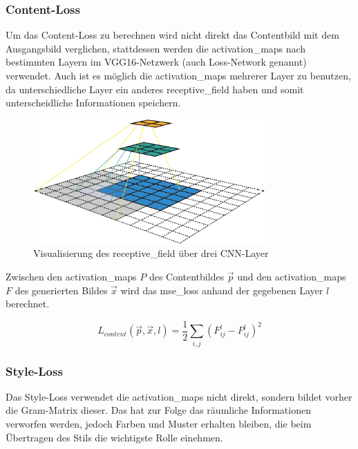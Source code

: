 \subsubsection{Content-Loss}
\label{sec:content_loss}

Um das Content-Loss zu berechnen wird nicht direkt das Contentbild mit dem Ausgangsbild verglichen, stattdessen werden die \gls{activation_map}s nach bestimmten Layern im VGG16-Netzwerk (auch Loss-Network genannt) verwendet. Auch ist es möglich die \gls{activation_map}s mehrerer Layer zu benutzen, da unterschiedliche Layer ein anderes \gls{receptive_field} haben und somit unterscheidliche Informationen speichern.

\begin{figure}[H]
	\centering
	\includegraphics[width=0.79\textwidth]{resources/content/receptive_field.png}
	\caption{Visualisierung des \gls{receptive_field} über drei CNN-Layer \cite{receptive_field_img}}
	\label{img:receptive_field_img}
\end{figure}

Zwischen den \gls{activation_map}s $ P $  des Contentbildes $ \vec{p} $ und den \gls{activation_map}s $ F $ des generierten Bildes $ \vec{x} $ wird das \gls{mse_loss} anhand der gegebenen Layer $ l $ berechnet.

\begin{equation}
	\label{eq:content_loss}
    L_{content} ( \vec{p}, \vec{x}, l ) = \frac{1}{2} \sum_{i, j} (F_{ij}^{l} - P_{ij}^{l})^2
\end{equation}

\subsubsection{Style-Loss}
\label{sec:style_loss}

Das Style-Loss verwendet die \gls{activation_map}s nicht direkt, sondern bildet vorher die Gram-Matrix dieser. Das hat zur Folge das räumliche Informationen verworfen werden, jedoch Farben und Muster erhalten bleiben, die beim Übertragen des Stils die wichtigste Rolle einehmen.

